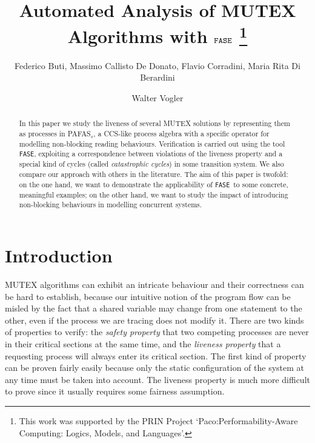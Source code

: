 \documentclass[copyright,creativecommons]{eptcs}
\title{Automated Analysis of MUTEX Algorithms with $\fase$
\thanks{
This work was supported by the PRIN Project `Paco:Performability-Aware
Computing: Logics, Models, and Languages'.}}
\author{Federico Buti, Massimo Callisto De Donato, Flavio Corradini, Maria Rita Di Berardini
\institute{School of Science and Technology, University of Camerino}
\email{\{federico.buti, massimo.callisto, flavio.corradini,
mariarita.diberardini\}@unicam.it}
\and
Walter Vogler
\institute{Institut f\"ur Informatik, Universit\"at Augsburg}
\email{vogler@informatik.uni-Augsburg.de}}
\newcommand{\fase}{\texttt{FASE}}
\begin{document}
\maketitle
 
\begin{abstract}
In this paper we study the liveness of several MUTEX solutions by
representing them as processes in PAFAS$_s$, a CCS-like process algebra
with a specific operator for modelling non-blocking reading behaviours.
Verification is carried out using the tool \fase, exploiting a
correspondence between violations of the liveness property and a special
kind of cycles (called {\em catastrophic cycles}) in some transition
system. We also compare our approach with others in the literature. The aim
of this paper is twofold: on the one hand, we want to demonstrate the
applicability of \fase\  to some concrete, meaningful examples; on the
other hand, we want to study the impact of introducing non-blocking
behaviours in modelling concurrent systems.
\end{abstract}


\section{Introduction}
MUTEX algorithms can exhibit an intricate behaviour and their correctness
can be hard to establish, because our intuitive notion of the program flow
can be misled by the fact that a shared variable may change from one
statement to the other, even if the process we are tracing does not modify
it. There are two kinds of properties to verify: the {\em safety property}
that two competing processes are never in their critical sections at the
same time, and the {\em liveness property} that a requesting process will
always enter its critical section. The first kind of property can be proven
fairly easily because only the static configuration of the system at any
time must be taken into account. The liveness property is much more
difficult to prove since it usually requires some fairness assumption.
\end{document}

